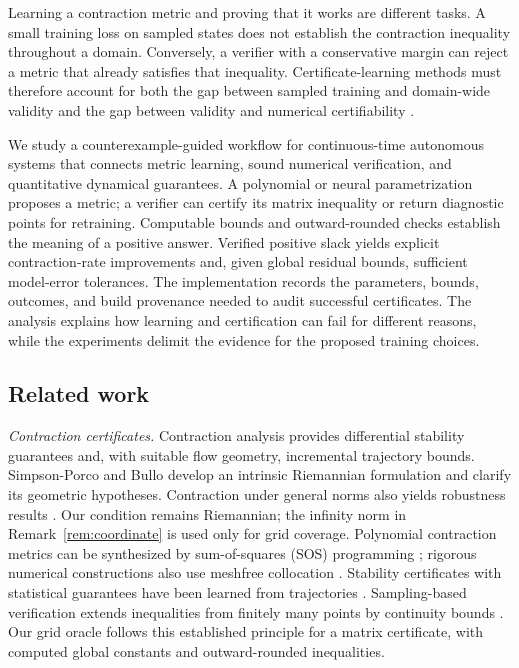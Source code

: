 \documentclass[12pt,onecolumn,journal]{IEEEtran}
\begin{document}
Learning a contraction metric and proving that it works are different tasks. A small training loss on sampled states does not establish the contraction inequality throughout a domain. Conversely, a verifier with a conservative margin can reject a metric that already satisfies that inequality. Certificate-learning methods must therefore account for both the gap between sampled training and domain-wide validity and the gap between validity and numerical certifiability \cite{dawson2023}.

We study a counterexample-guided workflow for continuous-time autonomous systems that connects metric learning, sound numerical verification, and quantitative dynamical guarantees. A polynomial or neural parametrization proposes a metric; a verifier can certify its matrix inequality or return diagnostic points for retraining. Computable bounds and outward-rounded checks establish the meaning of a positive answer. Verified positive slack yields explicit contraction-rate improvements and, given global residual bounds, sufficient model-error tolerances. The implementation records the parameters, bounds, outcomes, and build provenance needed to audit successful certificates. The analysis explains how learning and certification can fail for different reasons, while the experiments delimit the evidence for the proposed training choices.

\subsection{Related work}

\noindent\textit{Contraction certificates.} Contraction analysis \cite{lohmiller1998,forni2014,tsukamoto2021tutorial,bullo2026} provides differential stability guarantees and, with suitable flow geometry, incremental trajectory bounds. Simpson-Porco and Bullo \cite{simpsonporco2014} develop an intrinsic Riemannian formulation and clarify its geometric hypotheses. Contraction under general norms also yields robustness results \cite{davydov2022noneuclidean}. Our condition remains Riemannian; the infinity norm in Remark~\ref{rem:coordinate} is used only for grid coverage. Polynomial contraction metrics can be synthesized by sum-of-squares (SOS) programming \cite{aylward2008}; rigorous numerical constructions also use meshfree collocation \cite{giesl2019,giesl2021}. Stability certificates with statistical guarantees have been learned from trajectories \cite{boffi2020}. Sampling-based verification extends inequalities from finitely many points by continuity bounds \cite{bobiti2018}. Our grid oracle follows this established principle for a matrix certificate, with computed global constants and outward-rounded inequalities.
\end{document}
